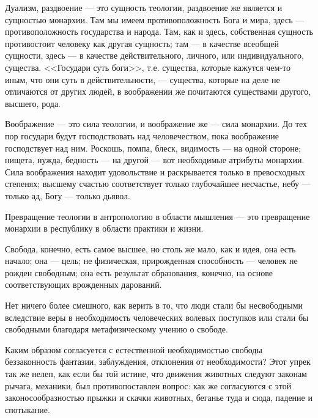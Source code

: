 \documentclass[12pt]{article}
\begin{document}
\bigskip

Дуализм, раздвоение --- это сущность теологии, раздвоение же является и сущностью монархии. Там мы имеем противоположность Бога и мира, здесь --- противоположность государства и народа. Там, как и здесь, собственная сущность противостоит человеку как другая сущность; там --- в качестве всеобщей сущности, здесь --- в качестве действительного, личного, или индивидуального, существа. <<Государи суть боги>>, т.е. существа, которые кажутся чем-то иным, что они суть в действительности, --- существа, которые на деле не отличаются от других людей, в воображении же почитаются существами другого, высшего, рода.

\bigskip

Воображение --- это сила теологии, и воображение же --- сила монархии. До тех пор государи будут господствовать над человечеством, пока воображение господствует над ним. Роскошь, помпа, блеск, видимость --- на одной стороне; нищета, нужда, бедность --- на другой --- вот необходимые атрибуты монархии. Сила воображения находит удовольствие и раскрывается только в превосходных степенях; высшему счастью соответствует только глубочайшее несчастье, небу --- только ад, Богу --- только дьявол.

\bigskip

Превращение теологии в антропологию в области мышления --- это превращение монархии в республику в области практики и жизни.

\bigskip

Свобода, конечно, есть самое высшее, но столь же мало, как и идея, она есть начало; она --- цель; не физическая, прирожденная способность --- человек не рожден свободным; она есть результат образования, конечно, на основе соответствующих врожденных дарований.

\bigskip

Нет ничего более смешного, как верить в то, что люди стали бы несвободными вследствие веры в необходимость человеческих волевых поступков или стали бы свободными благодаря метафизическому учению о свободе.

\bigskip

Каким образом согласуется с естественной необходимостью свободы беззаконность фантазии, заблуждения, отклонения от необходимости? Этот упрек так же нелеп, как если бы той истине, что движения животных следуют законам рычага, механики, был противопоставлен вопрос: как же согласуются с этой законосообразностью прыжки и скачки животных, беганье туда и сюда, падение и спотыкание.
\end{document}
